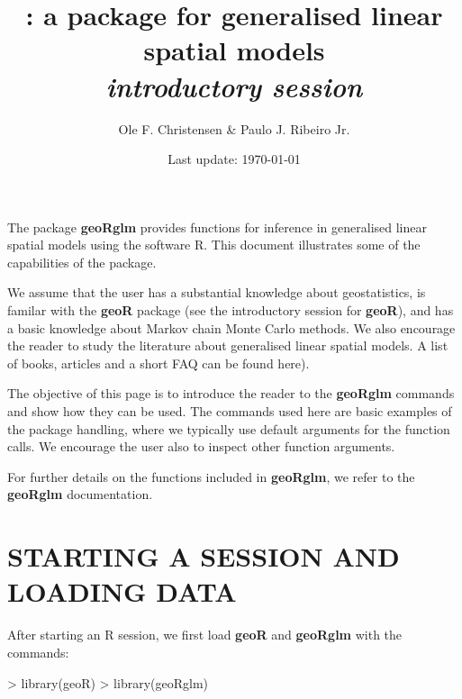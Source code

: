 \documentclass[12pt,a4paper]{article}
\title{\pkg{geoRglm} : a package for  generalised linear spatial models
\\{\it introductory session}}
\author{Ole F. Christensen \& Paulo J. Ribeiro Jr.}
\date{Last update: \today}
\newcommand{\strong}[1]{{\textbf{ #1}}}
\let\pkg=\strong
\newcommand{\R}{{\textsf{R}}{}}
\begin{document}
\maketitle



The package \pkg{geoRglm} provides functions
for inference in generalised linear spatial models using the software \R.
This document illustrates some of the capabilities of the package.

We assume that the user has a substantial knowledge about geostatistics, is familar with the \pkg{geoR} package
(see the  introductory session for \pkg{geoR}), 
and has a basic knowledge about Markov chain Monte Carlo methods. We also encourage the reader to study the literature about generalised linear spatial models.
A list of books, articles and a short FAQ can be found here).

The objective of this page is to introduce the reader to the 
\pkg{geoRglm} commands and show how they can be used.
The commands used here are basic examples of the package handling, where we typically use default arguments for the function calls.
We encourage the user also to inspect other function arguments.

For further details on the functions included in \pkg{geoRglm}, we refer to the \pkg{geoRglm} documentation.

\section{STARTING A SESSION AND LOADING DATA}
After starting an \R{} session, we first load \pkg{geoR} and \pkg{geoRglm} with the commands:
\begin{Schunk}
\begin{Sinput}
> library(geoR)
> library(geoRglm)
\end{Sinput}
\end{Schunk}
\end{document}
